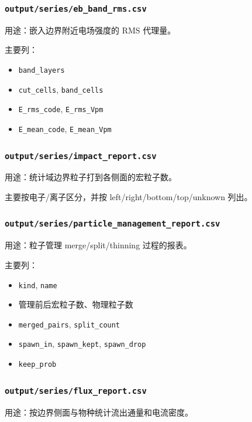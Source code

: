 \documentclass[11pt,a4paper]{ctexart}
\newcommand{\code}[1]{\texttt{#1}}
\newcommand{\file}[1]{\texttt{#1}}
\begin{document}
\subsubsection{\file{output/series/eb\_band\_rms.csv}}

用途：嵌入边界附近电场强度的 RMS 代理量。

主要列：

\begin{itemize}
  \item \code{band\_layers}
  \item \code{cut\_cells}, \code{band\_cells}
  \item \code{E\_rms\_code}, \code{E\_rms\_Vpm}
  \item \code{E\_mean\_code}, \code{E\_mean\_Vpm}
\end{itemize}

\subsubsection{\file{output/series/impact\_report.csv}}

用途：统计域边界粒子打到各侧面的宏粒子数。

主要按电子/离子区分，并按 left/right/bottom/top/unknown 列出。

\subsubsection{\file{output/series/particle\_management\_report.csv}}

用途：粒子管理 merge/split/thinning 过程的报表。

主要列：

\begin{itemize}
  \item \code{kind}, \code{name}
  \item 管理前后宏粒子数、物理粒子数
  \item \code{merged\_pairs}, \code{split\_count}
  \item \code{spawn\_in}, \code{spawn\_kept}, \code{spawn\_drop}
  \item \code{keep\_prob}
\end{itemize}

\subsubsection{\file{output/series/flux\_report.csv}}

用途：按边界侧面与物种统计流出通量和电流密度。
\end{document}
